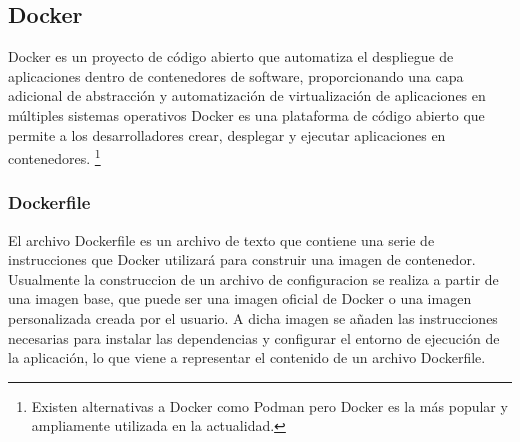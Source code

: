 \documentclass[12pt, a4paper, twoside]{article}
\begin{document}
\subsection{Docker}
\label{sec:Docker}
Docker \cite{docker} es un proyecto de código abierto que automatiza el despliegue de aplicaciones dentro de contenedores de software, proporcionando una capa adicional de abstracción y automatización de virtualización de aplicaciones en múltiples sistemas operativos
Docker es una plataforma de código abierto que permite a los desarrolladores crear, desplegar y ejecutar aplicaciones en contenedores. 
\footnote{Existen alternativas a Docker como Podman \cite{podman} pero Docker es la más popular y ampliamente utilizada en la actualidad.}
\subsubsection{Dockerfile}
El archivo Dockerfile \cite{dockerfile_concepts} es un archivo de texto que contiene una serie de instrucciones que Docker utilizará para construir una imagen de contenedor.
Usualmente la construccion de un archivo de configuracion se realiza a partir de una imagen base, que puede ser una imagen oficial de Docker o una imagen personalizada creada por el usuario.
A dicha imagen se añaden las instrucciones necesarias para instalar las dependencias y configurar el entorno de ejecución de la aplicación, lo que viene a representar el contenido de un archivo Dockerfile.
\newpage
\end{document}
